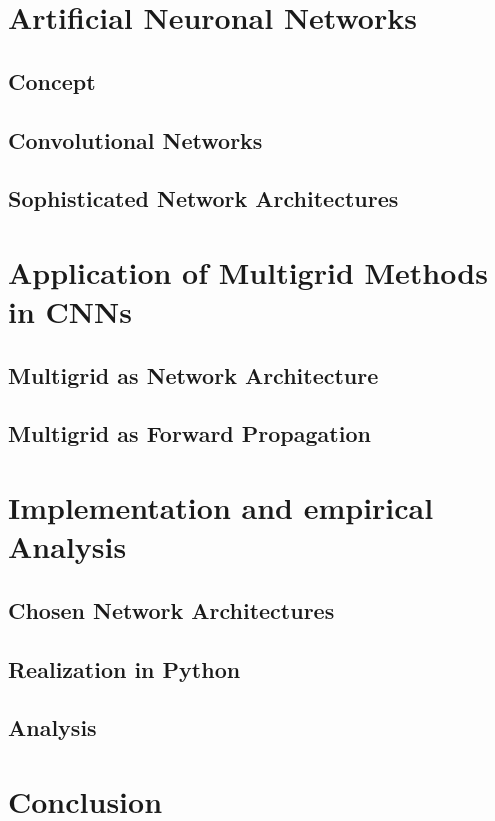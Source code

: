 \documentclass[a4paper,12pt,titlepage,enabledeprecatedfontcommands]{scrreprt}
\begin{document}
\chapter{Artificial Neuronal Networks}
\section{Concept}
\section{Convolutional Networks}
\section{Sophisticated Network Architectures}
\chapter{Application of Multigrid Methods in CNNs}
\section{Multigrid as Network Architecture}
\section{Multigrid as Forward Propagation}
\chapter{Implementation and empirical Analysis}
\section{Chosen Network Architectures}
\section{Realization in Python}
\section{Analysis}
\chapter{Conclusion}
\cite{Goodfellow-et-al-2016}


 \label{bibtex}
\end{document}
